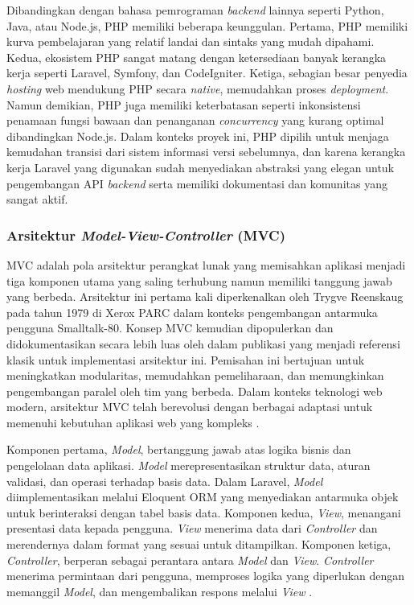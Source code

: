 Dibandingkan dengan bahasa pemrograman \textit{backend} lainnya seperti Python, Java, atau Node.js, PHP memiliki beberapa keunggulan. Pertama, PHP memiliki kurva pembelajaran yang relatif landai dan sintaks yang mudah dipahami. Kedua, ekosistem PHP sangat matang dengan ketersediaan banyak kerangka kerja seperti Laravel, Symfony, dan CodeIgniter. Ketiga, sebagian besar penyedia \textit{hosting} web mendukung PHP secara \textit{native}, memudahkan proses \textit{deployment}. Namun demikian, PHP juga memiliki keterbatasan seperti inkonsistensi penamaan fungsi bawaan dan penanganan \textit{concurrency} yang kurang optimal dibandingkan Node.js. Dalam konteks proyek ini, PHP dipilih untuk menjaga kemudahan transisi dari sistem informasi versi sebelumnya, dan karena kerangka kerja Laravel yang digunakan sudah menyediakan abstraksi yang elegan untuk pengembangan API \textit{backend} serta memiliki dokumentasi dan komunitas yang sangat aktif.

\subsubsection{Arsitektur \textit{Model-View-Controller} (MVC)}

MVC adalah pola arsitektur perangkat lunak yang memisahkan aplikasi menjadi tiga komponen utama yang saling terhubung namun memiliki tanggung jawab yang berbeda. Arsitektur ini pertama kali diperkenalkan oleh Trygve Reenskaug pada tahun 1979 di Xerox PARC dalam konteks pengembangan antarmuka pengguna Smalltalk-80. Konsep MVC kemudian dipopulerkan dan didokumentasikan secara lebih luas oleh \citet{Krasner_1988_MVC} dalam publikasi yang menjadi referensi klasik untuk implementasi arsitektur ini. Pemisahan ini bertujuan untuk meningkatkan modularitas, memudahkan pemeliharaan, dan memungkinkan pengembangan paralel oleh tim yang berbeda. Dalam konteks teknologi web modern, arsitektur MVC telah berevolusi dengan berbagai adaptasi untuk memenuhi kebutuhan aplikasi web yang kompleks \citep{Sastypratiwi_2019_MVCComponentWeb}.

Komponen pertama, \textit{Model}, bertanggung jawab atas logika bisnis dan pengelolaan data aplikasi. \textit{Model} merepresentasikan struktur data, aturan validasi, dan operasi terhadap basis data. Dalam Laravel, \textit{Model} diimplementasikan melalui Eloquent ORM yang menyediakan antarmuka objek untuk berinteraksi dengan tabel basis data. Komponen kedua, \textit{View}, menangani presentasi data kepada pengguna. \textit{View} menerima data dari \textit{Controller} dan merendernya dalam format yang sesuai untuk ditampilkan. Komponen ketiga, \textit{Controller}, berperan sebagai perantara antara \textit{Model} dan \textit{View}. \textit{Controller} menerima permintaan dari pengguna, memproses logika yang diperlukan dengan memanggil \textit{Model}, dan mengembalikan respons melalui \textit{View} \citep{Laravel_2026_Docs}.


